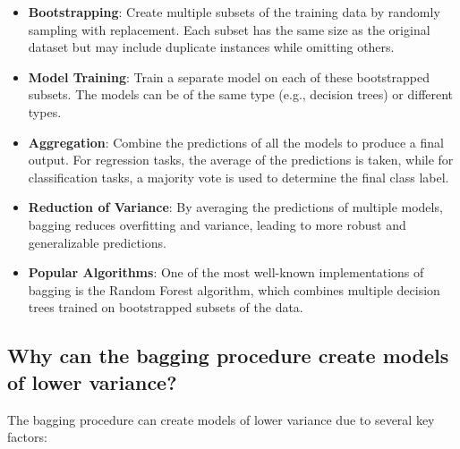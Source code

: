\begin{itemize}
    \item \textbf{Bootstrapping}: Create multiple subsets of the training data by randomly sampling with replacement. Each subset has the same size as the original dataset but may include duplicate instances while omitting others.
    \item \textbf{Model Training}: Train a separate model on each of these bootstrapped subsets. The models can be of the same type (e.g., decision trees) or different types.
    \item \textbf{Aggregation}: Combine the predictions of all the models to produce a final output. For regression tasks, the average of the predictions is taken, while for classification tasks, a majority vote is used to determine the final class label.
    \item \textbf{Reduction of Variance}: By averaging the predictions of multiple models, bagging reduces overfitting and variance, leading to more robust and generalizable predictions.
    \item \textbf{Popular Algorithms}: One of the most well-known implementations of bagging is the Random Forest algorithm, which combines multiple decision trees trained on bootstrapped subsets of the data.
\end{itemize}


\subsection{Why can the bagging procedure create models of lower variance?}

The bagging procedure can create models of lower variance due to several key factors:

